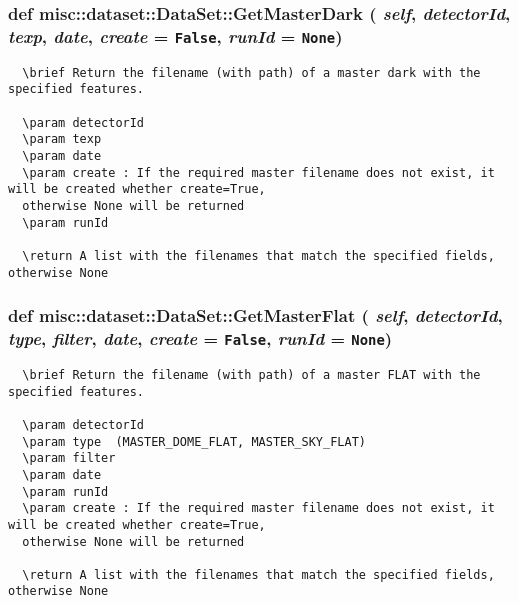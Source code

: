 \subsubsection{\setlength{\rightskip}{0pt plus 5cm}def misc::dataset::Data\-Set::Get\-Master\-Dark ( {\em self},  {\em detector\-Id},  {\em texp},  {\em date},  {\em create} = {\tt False},  {\em run\-Id} = {\tt None})}\label{classmisc_1_1dataset_1_1DataSet_a9179b5782363cadaead4e66ee47eadd}




\footnotesize\begin{verbatim}
  \brief Return the filename (with path) of a master dark with the specified features.

  \param detectorId
  \param texp
  \param date
  \param create : If the required master filename does not exist, it will be created whether create=True,
  otherwise None will be returned
  \param runId

  \return A list with the filenames that match the specified fields, otherwise None
\end{verbatim}
\normalsize
\subsubsection{\setlength{\rightskip}{0pt plus 5cm}def misc::dataset::Data\-Set::Get\-Master\-Flat ( {\em self},  {\em detector\-Id},  {\em type},  {\em filter},  {\em date},  {\em create} = {\tt False},  {\em run\-Id} = {\tt None})}\label{classmisc_1_1dataset_1_1DataSet_ed292c160648c23b78dfb1f2995959b9}




\footnotesize\begin{verbatim}
  \brief Return the filename (with path) of a master FLAT with the specified features.

  \param detectorId
  \param type  (MASTER_DOME_FLAT, MASTER_SKY_FLAT)
  \param filter
  \param date
  \param runId
  \param create : If the required master filename does not exist, it will be created whether create=True,
  otherwise None will be returned
  
  \return A list with the filenames that match the specified fields, otherwise None
\end{verbatim}
\normalsize
